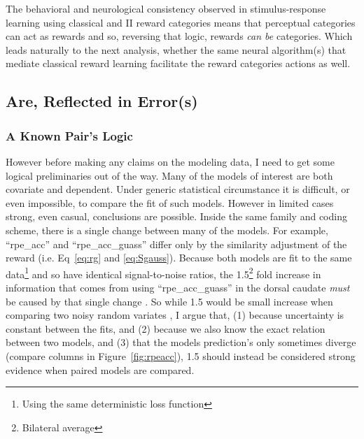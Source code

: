 \documentclass[doc,12pt]{apa}        %
\begin{document}
The behavioral and neurological consistency observed in stimulus-response learning using classical and II reward categories means that perceptual categories can act as rewards and so, reversing that logic, rewards \emph{can be} categories.   Which leads naturally to the next analysis, whether the same neural algorithm(s) that mediate classical reward learning facilitate the reward categories actions as well.

\subsection{Are, Reflected in Error(s)}
\label{sub:inerror}
\subsubsection{A Known Pair's Logic}
\label{subsub:onestep}
However before making any claims on the modeling data, I need to get some logical preliminaries out of the way.  Many of the models of interest are both covariate and dependent.  Under generic statistical circumstance it is difficult, or even impossible, to compare the fit of such models.  However in limited cases strong, even casual, conclusions are possible.   Inside the same family and coding scheme, there is a single change between many of the models.  For example, ``rpe\_acc'' and ``rpe\_acc\_guass'' differ only by the similarity adjustment of the reward (i.e. Eq~\ref{eq:rg} and \ref{eq:Sgauss}).  Because both models are fit to the same data\footnote{Using the same deterministic loss function} and so have identical signal-to-noise ratios, the 1.5\footnote{Bilateral average} fold increase in information that comes from using ``rpe\_acc\_guass'' in the dorsal caudate \emph{must} be caused by that single change \cite{Pearl:2010p9726}.  So while 1.5 would be small increase when comparing two noisy random variates \cite{Anderson:2000p9475,Forster:2000p9623}, I argue that, (1) because uncertainty is constant between the fits, and (2) because we also know the exact relation between two models, and (3) that the models prediction's only sometimes diverge (compare columns in Figure~\ref{fig:rpeacc}), 1.5 should instead be considered strong evidence when paired models are compared.
\end{document}
